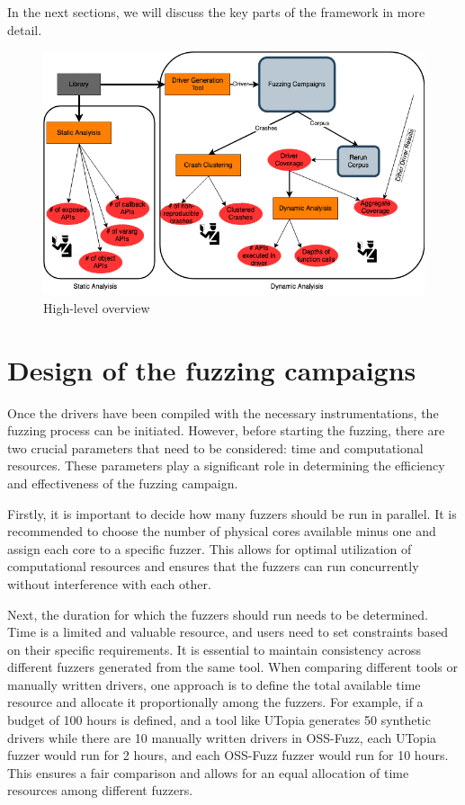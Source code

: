 \documentclass[a4paper,11pt,oneside]{report}
\begin{document}
In the next sections, we will discuss the key parts of the framework in more detail.

\begin{figure}[ht]
	\centering
	\includegraphics[width=16cm]{figures/framework.png}
	\caption{High-level overview}
	\label{fig:framework}
\end{figure}

\section{Design of the fuzzing campaigns}
Once the drivers have been compiled with the necessary
instrumentations, the fuzzing process can be initiated. 
However, before starting the fuzzing, there are two crucial
parameters that need to be considered: time and computational 
resources. These parameters play a significant role in determining
the efficiency and effectiveness of the fuzzing campaign.

Firstly, it is important to decide how many fuzzers should be 
run in parallel. It is recommended to choose the number of 
physical cores available minus one and assign each core to a 
specific fuzzer. This allows for optimal utilization of 
computational resources and ensures that the fuzzers can run 
concurrently without interference with each other.

Next, the duration for which the fuzzers should run needs to be 
determined. Time is a limited and valuable resource, and users 
need to set constraints based on their specific requirements. It
is essential to maintain consistency across different fuzzers 
generated from the same tool. When comparing different tools or 
manually written drivers, one approach is to define the total 
available time resource and allocate it proportionally among the 
fuzzers. For example, if a budget of 100 hours is defined, and a 
tool like UTopia generates 50 synthetic drivers while there are 10
manually written drivers in OSS-Fuzz, each UTopia fuzzer would run 
for 2 hours, and each OSS-Fuzz fuzzer would run for 10 hours. This
ensures a fair comparison and allows for an equal allocation of 
time resources among different fuzzers.
\end{document}
